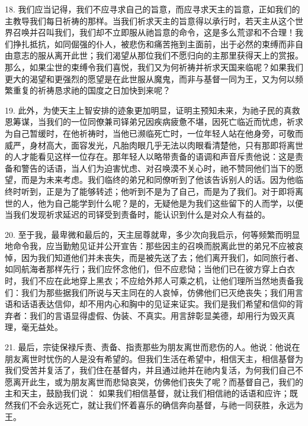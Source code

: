 18. 我们应当记得，我们不应寻求自己的旨意，而应寻求天主的旨意，正如我们的主教导我们每日祈祷的那样。当我们祈求天主的旨意得以承行时，若天主从这个世界召唤并召叫我们，我们却不立即服从祂旨意的命令，这是多么荒谬和不合理！我们挣扎抵抗，如同倔强的仆人，被悲伤和痛苦拖到主面前，出于必然的束缚而非自由意志的服从离开此世；我们渴望从那位我们不愿归向的主那里获得天上的赏报。那么，如果尘世的束缚令我们喜悦，我们又为何祈祷并祈求天国来临呢？如果我们更大的渴望和更强烈的愿望是在此世服从魔鬼，而非与基督一同为王，又为何以频繁重复的祈祷恳求祂的国度之日加快到来呢？\par

19. 此外，为使天主上智安排的迹象更加明显，证明主预知未来，为祂子民的真救恩筹谋，当我们的一位同僚兼司铎弟兄因疾病疲惫不堪，因死亡临近而忧虑，祈求为自己暂缓时，在他祈祷时，当他已濒临死亡时，一位年轻人站在他身旁，可敬而威严，身材高大，面容发光，凡胎肉眼几乎无法以肉眼看清楚他，只有那即将离世的人才能看见这样一位存在。那年轻人以略带责备的语调和声音斥责他说：这是责备和警告的话语，当人们为迫害忧虑、对召唤漠不关心时，祂不赞同他们当下的愿望，而是为未来考虑。我们临终的弟兄和同僚听到了他该告诉别人的话。因为他临终时听到，正是为了能够转述；他听到不是为了自己，而是为了我们。对于即将离世的人，他为自己能学到什么呢？是的，无疑他是为我们这些留下的人而学，以便当我们发现祈求延迟的司铎受到责备时，能认识到什么是对众人有益的。\par

20. 至于我，最卑微和最后的，天主屈尊就卑，多少次向我启示，何等频繁而明显地命令我，应当勤勉见证并公开宣告：那些因主的召唤而脱离此世的弟兄不应被哀悼，因为我们知道他们并未丧失，而是被先送了去；他们离开我们，如同旅行者、如同航海者那样先行；我们应怀念他们，但不应悲恸；当他们已在彼方穿上白衣时，我们不应在此地穿上黑衣；不应给外邦人可乘之机，让他们理所当然地责备我们：我们为那些据我们所说与天主同在的人哀悼，仿佛他们已灭绝丧失；我们用言语和话语表达信仰，却不用内心和胸中的见证来证实。我们是我们希望和信仰的背弃者：我们的言语显得虚假、伪装、不真实。用言辞彰显美德，却用行为毁灭真理，毫无益处。\par

21. 最后，宗徒保禄斥责、责备、指责那些为朋友离世而悲伤的人。他说：他说在朋友离世时忧伤的人是没有希望的。但我们生活在希望中，相信天主，相信基督为我们受苦并复活了，我们住在基督内，并且通过祂并在祂内复活，为何我们自己不愿离开此生，或为朋友离世而悲恸哀哭，仿佛他们丧失了呢？而基督自己，我们的主和天主，鼓励我们说： 如果我们相信基督，就让我们相信祂的话语和应许；既然我们不会永远死亡，就让我们怀着喜乐的确信奔向基督，与祂一同获胜，永远为王。\par

